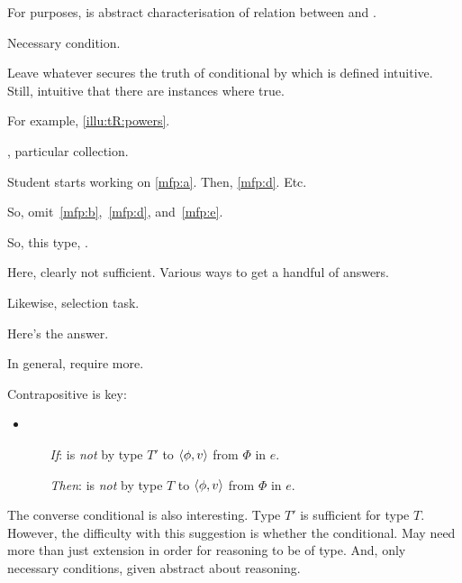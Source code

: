 \begin{note}
  For purposes, \rotoc{} is abstract characterisation of relation between \tC{} and \ptC{}.

  Necessary condition.

  Leave whatever secures the truth of conditional by which \rotoc{} is defined intuitive.
  Still, intuitive that there are instances where true.

  For example, \autoref{illu:tR:powers}.

  \tocN{}, particular collection.

  Student starts working on \ref{mfp:a}.
  Then, \ref{mfp:d}.
  Etc.

  So, omit~\ref{mfp:b},~\ref{mfp:d}, and~\ref{mfp:e}.

  So, this type, \rotoc{}.

  Here, clearly not sufficient.
  Various ways to get a handful of answers.


  Likewise, selection task.

  Here's the answer.

  In general, require more.
\end{note}

\begin{note}
  Contrapositive is key:

  \begin{itemize}
  \item
    \begin{itemize}
    \item[\emph{If}:]
      \vAgent{} is \emph{not} \ptCV{} by type \(T'\) to \(\langle \phi, v \rangle\) from \(\Phi\) in \(e\).
    \item[\emph{Then}:]
      \vAgent{} is \emph{not} \tCV{} by type \(T\) to \(\langle \phi, v \rangle\) from \(\Phi\) in \(e\).
    \end{itemize}
  \end{itemize}
\end{note}

\begin{note}
  The converse conditional is also interesting.
  Type \(T'\) is sufficient for type \(T\).
  However, the difficulty with this suggestion is whether the conditional.
  May need more than just extension in order for reasoning to be of type.
  And, only necessary conditions, given abstract about reasoning.
\end{note}

\subsection{}
\label{cha:typical:tCDef:tRDef}

